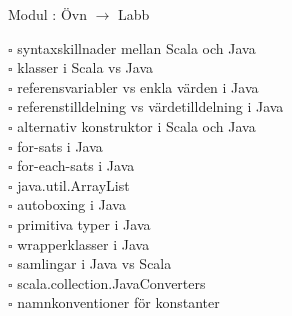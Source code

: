 
Modul : Övn  $\rightarrow$ Labb 
\begin{multicols}{3}\SlideFontTiny
$\square$ syntaxskillnader mellan Scala och Java \\
$\square$ klasser i Scala vs Java \\
$\square$ referensvariabler vs enkla värden i Java \\
$\square$ referenstilldelning vs värdetilldelning i Java \\
$\square$ alternativ konstruktor i Scala och Java \\
$\square$ for-sats i Java \\
$\square$ for-each-sats i Java \\
$\square$ java.util.ArrayList \\
$\square$ autoboxing i Java \\
$\square$ primitiva typer i Java \\
$\square$ wrapperklasser i Java \\
$\square$ samlingar i Java vs Scala \\
$\square$ scala.collection.JavaConverters \\
$\square$ namnkonventioner för konstanter \\     
\end{multicols}
